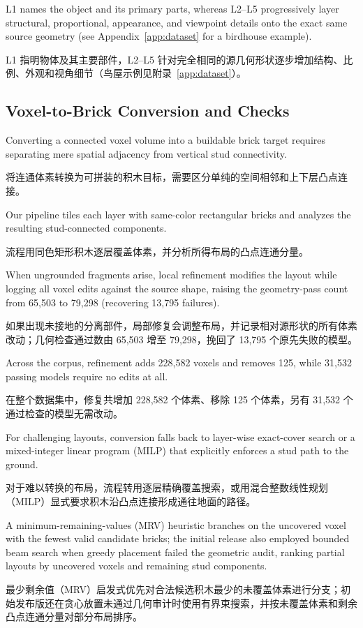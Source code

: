\documentclass[11pt,letterpaper]{article}
\newcommand{\zh}[1]{{\chinesefont #1}}
\newcommand{\pair}[2]{\par\addvspace{4pt}\noindent
  \begin{minipage}{\linewidth}\raggedright
  #1\par\nobreak\vspace{1pt}
  {\color{translation}\chinesefont\fontsize{10.5}{15.3}\selectfont #2\par}
  \end{minipage}\par}
\begin{document}
\pair{L1 names the object and its primary parts, whereas L2--L5 progressively layer structural, proportional, appearance, and viewpoint details onto the exact same source geometry (see Appendix~\ref{app:dataset} for a birdhouse example).}{L1 指明物体及其主要部件，L2–L5 针对完全相同的源几何形状逐步增加结构、比例、外观和视角细节（鸟屋示例见附录~\ref{app:dataset}）。}

\subsection{Voxel-to-Brick Conversion and Checks\enspace\zh{体素转积木与几何校验}}

\pair{Converting a connected voxel volume into a buildable brick target requires separating mere spatial adjacency from vertical stud connectivity.}{将连通体素转换为可拼装的积木目标，需要区分单纯的空间相邻和上下层凸点连接。}

\pair{Our pipeline tiles each layer with same-color rectangular bricks and analyzes the resulting stud-connected components.}{流程用同色矩形积木逐层覆盖体素，并分析所得布局的凸点连通分量。}

\pair{When ungrounded fragments arise, local refinement modifies the layout while logging all voxel edits against the source shape, raising the geometry-pass count from 65,503 to 79,298 (recovering 13,795 failures).}{如果出现未接地的分离部件，局部修复会调整布局，并记录相对源形状的所有体素改动；几何检查通过数由 65,503 增至 79,298，挽回了 13,795 个原先失败的模型。}

\pair{Across the corpus, refinement adds 228,582 voxels and removes 125, while 31,532 passing models require no edits at all.}{在整个数据集中，修复共增加 228,582 个体素、移除 125 个体素，另有 31,532 个通过检查的模型无需改动。}

\pair{For challenging layouts, conversion falls back to layer-wise exact-cover search or a mixed-integer linear program (MILP) that explicitly enforces a stud path to the ground.}{对于难以转换的布局，流程转用逐层精确覆盖搜索，或用混合整数线性规划（MILP）显式要求积木沿凸点连接形成通往地面的路径。}

\pair{A minimum-remaining-values (MRV) heuristic branches on the uncovered voxel with the fewest valid candidate bricks; the initial release also employed bounded beam search when greedy placement failed the geometric audit, ranking partial layouts by uncovered voxels and remaining stud components.}{最少剩余值（MRV）启发式优先对合法候选积木最少的未覆盖体素进行分支；初始发布版还在贪心放置未通过几何审计时使用有界束搜索，并按未覆盖体素和剩余凸点连通分量对部分布局排序。}
\end{document}
